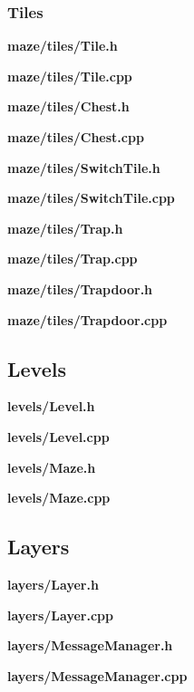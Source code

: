 \documentclass[../Main.tex]{subfiles}
\begin{document}
        \subsubsection{Tiles}
            \textbf{maze/tiles/Tile.h}
            
            \textbf{maze/tiles/Tile.cpp}
            

            \textbf{maze/tiles/Chest.h}
            
            \textbf{maze/tiles/Chest.cpp}
            

            \textbf{maze/tiles/SwitchTile.h}
            
            \textbf{maze/tiles/SwitchTile.cpp}
            

            \textbf{maze/tiles/Trap.h}
            
            \textbf{maze/tiles/Trap.cpp}
            

            \textbf{maze/tiles/Trapdoor.h}
            
            \textbf{maze/tiles/Trapdoor.cpp}
            

    \subsection{Levels}
        \textbf{levels/Level.h}
        
        \textbf{levels/Level.cpp}
        

        \textbf{levels/Maze.h}
        
        \textbf{levels/Maze.cpp}
        
    \subsection{Layers}
        \textbf{layers/Layer.h}
        
        \textbf{layers/Layer.cpp}
        

        \textbf{layers/MessageManager.h}
        
        \textbf{layers/MessageManager.cpp}
        
\end{document}
